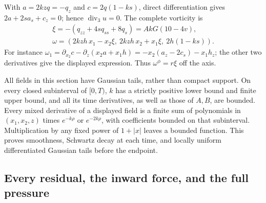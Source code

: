 With \(a=2kzq=-q_z\) and \(c=2q(1-ks)\), direct differentiation gives
\(2a+2s a_s+c_z=0\); hence \(\operatorname{div}_3u=0\).
The complete vorticity is
\begin{equation}\label{eq:ag-vorticity}
 \begin{gathered}
 \xi=-(q_{zz}+4s q_{ss}+8q_s)=A kG(10-4v),\\
 \omega=(2kzh\,x_1-x_2\xi,\ 2kzh\,x_2+x_1\xi,\ 2h(1-ks)).
 \end{gathered}
\end{equation}
For instance \(\omega_1=\partial_{x_2}c-\partial_z(x_2a+x_1h)
=-x_2(a_z-2c_s)-x_1h_z\); the other two derivatives give the
displayed expression.  Thus \(\omega^\phi=r\xi\) off the axis.

All fields in this section have Gaussian tails, rather than compact
support.  On every closed subinterval of \([0,T)\), \(k\) has a strictly
positive lower bound and finite upper bound, and all its time derivatives,
as well as those of \(A,B\), are bounded.  Every mixed derivative of a
displayed field is a finite sum of polynomials in \((x_1,x_2,z)\) times
\(e^{-k\rho}\) or \(e^{-2k\rho}\), with coefficients bounded on that
subinterval.  Multiplication by any fixed power of \(1+|x|\) leaves a
bounded function.  This proves smoothness, Schwartz decay at each time,
and locally uniform differentiated Gaussian tails before the endpoint.

\subsection{Every residual, the inward force, and the full pressure}

